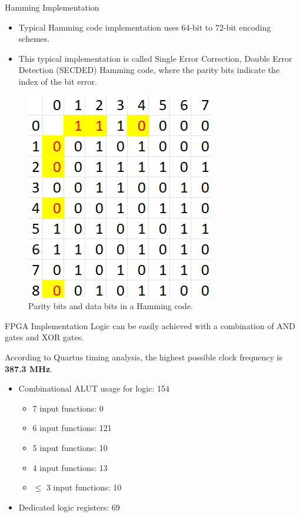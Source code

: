 \documentclass{beamer}
\begin{document}
\begin{frame}{Hamming Implementation}
  \begin{itemize}
    \item Typical Hamming code implementation uses 64-bit to 72-bit encoding schemes.
    \item This typical implementation is called Single Error Correction,
    Double Error Detection (SECDED) Hamming code, where the parity bits indicate the index of the bit error.
  \end{itemize}
  \begin{figure}[htbp]
    \centerline{\includegraphics[scale = 0.6]{Images/Hamming_example.png}}
    \caption{Parity bits and data bits in a Hamming code.}
  \end{figure}
\end{frame}

\begin{frame}{FPGA Implementation}
    Logic can be easily achieved with a combination of AND gates and XOR gates.

    According to Quartus timing analysis, the highest possible clock frequency is
    \textbf{387.3 MHz}.

    \begin{itemize}
      \item Combinational ALUT usage for logic: 154
      \begin{itemize}
        \item 7 input functions: 0
        \item 6 input functions: 121
        \item 5 input functions: 10
        \item 4 input functions: 13
        \item $\leq$ 3 input functions: 10
      \end{itemize}
      \item Dedicated logic registers: 69
    \end{itemize}
\end{frame}
\end{document}
